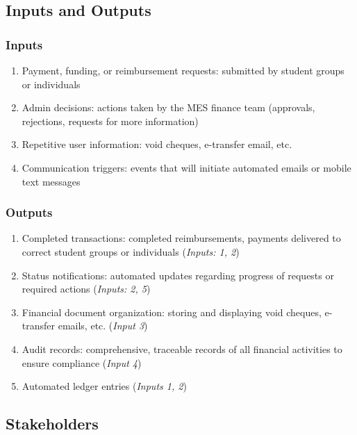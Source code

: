 \documentclass{article}
\begin{document}
\subsection{Inputs and Outputs}


\subsubsection{Inputs}

\begin{enumerate}
    \item Payment, funding, or reimbursement requests: submitted by student groups or individuals
    \item Admin decisions: actions taken by the MES finance team (approvals, rejections, requests for more information)
    \item Repetitive user information: void cheques, e-transfer email, etc.
    \item Communication triggers: events that will initiate automated emails or mobile text messages
\end{enumerate}

\subsubsection{Outputs}

\begin{enumerate}
    \item Completed transactions: completed reimbursements, payments delivered to correct student groups or individuals (\emph{Inputs: 1, 2})
    \item Status notifications: automated updates regarding progress of requests or required actions (\emph{Inputs: 2, 5})
    \item Financial document organization: storing and displaying void cheques, e-transfer emails, etc. (\emph{Input 3})
    \item Audit records: comprehensive, traceable records of all financial activities to ensure compliance (\emph{Input 4})
    \item Automated ledger entries (\emph{Inputs 1, 2})
\end{enumerate}

\subsection{Stakeholders}
\end{document}
